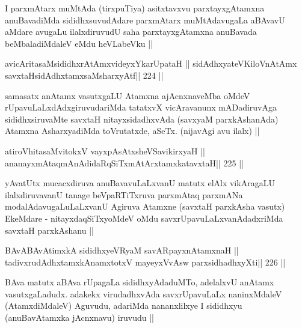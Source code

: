 \begin{artha}
I  parxmAtarx muMtAda (tirxpuTiya) asitxtavxvu parxtayxgAtamxna
anuBavadiMda sididhxsuvudAdare parxmAtarx muMtAdavugaLa aBAvavU aMdare
avugaLu ilalxdiruvudU saha parxtayxgAtamxna anuBavada beMbaladiMdaleV
eMdu heVLabeVku ||
\end{artha}


\begin{shl}
avicAritasaMsididhxrAtAmxvideyxYkarUpataH ||
sidAdhxyateV\s KiloV\s nAtAmx savxtaHsidAdhxtamxsaMsharxyAtf\hfill || 224 ||
\end{shl}

\begin{artha}
samasatx anAtamx vasutxgaLU Atamxna ajAcnxnaveMba oMdeV
rUpavuLaLxdAdxgiruvudariMda tatatxvX vicAravanunx mADadiruvAga
sididhxsiruvaMte savxtaH nitayxsidadhxvAda (savxyaM parxkAshanAda)
Atamxna AsharxyadiMda toVrutatxde, aSeTx. (nijavAgi avu ilalx) ||
\end{artha}


\begin{shl}
atiroVhitasaMvitokxV vayxpAsAtxsheVSavikirxyaH ||
ananayxmAtaqmAnAdidaRqSiTxmAtArxtamxkatavxtaH\hfill || 225 ||
\end{shl}

\begin{artha}
yAvatUtx mucacxdiruva anuBavavuLaLxvanU matutx elAlx vikAragaLU
ilalxdiruvavanU tanage beVpaRTiTxruva parxmAtaq parxmANa
modalAdavugaLuLaLxvanU Agiruva Atamxne (savxtaH parxkAsha vasutx)
EkeMdare - nitayxdaqSiTxyoMdeV oMdu savxrUpavuLaLxvanAdadxriMda savxtaH
parxkAshanu ||
\end{artha}

\begin{shl}
BAvABAvAtimxkA sididhxyeVRyaM savAR\s payxnAtamxnaH ||
tadivxrudAdhxtamxkAnamxtotxV mayeyxVvAsw parxsidhadhxyXti\hfill || 226 ||
\end{shl}

\begin{artha}
BAva matutx aBAva rUpagaLa sididhxyAdaduMTo, adelalxvU
anAtamx vasutxgaLadudx. adakekx virudadhxvAda savxrUpavuLaLx
naninxMdaleV (AtamxdiMdaleV) Aguvudu, adariMda nananxlilxye I
sididhxyu (anuBavAtamxka jAcnxnavu) iruvudu ||
\end{artha}

